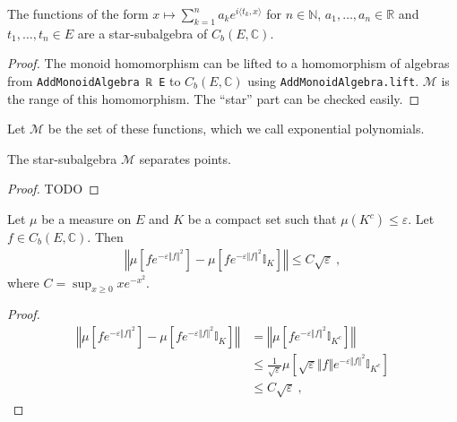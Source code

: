 \begin{lemma}\label{lem:starSubalgebra_expPoly}
 \leanok
The functions of the form $x \mapsto \sum_{k=1}^n a_k e^{i\langle t_k, x\rangle}$ for $n \in \mathbb{N}$, $a_1, \ldots, a_n \in \mathbb{R}$ and $t_1, \ldots, t_n \in E$ are a star-subalgebra of $C_b(E, \mathbb{C})$. 
\end{lemma}

\begin{proof} \leanok
The monoid homomorphism can be lifted to a homomorphism of algebras from \texttt{AddMonoidAlgebra ℝ E} to $C_b(E, \mathbb{C})$ using \texttt{AddMonoidAlgebra.lift}. $\mathcal M$ is the range of this homomorphism. The ``star'' part can be checked easily.
\end{proof}

Let $\mathcal M$ be the set of these functions, which we call exponential polynomials.

\begin{lemma}\label{lem:separates_points_expPoly}
 \leanok
{}
The star-subalgebra $\mathcal M$ separates points.
\end{lemma}

\begin{proof}
TODO
\end{proof}

\begin{lemma}\label{lem:integral_restrict_compact}
Let $\mu$ be a measure on $E$ and $K$ be a compact set such that $\mu(K^c) \le \varepsilon$. Let $f \in C_b(E, \mathbb{C})$. Then
\begin{align*}
\left\Vert \mu[fe^{-\varepsilon \Vert f \Vert^2}] - \mu[f e^{-\varepsilon \Vert f \Vert^2} \mathbb{I}_K] \right\Vert
\le C \sqrt{\varepsilon} \: ,
\end{align*}
where $C = \sup_{x \ge 0} x e^{-x^2}$.
\end{lemma}

\begin{proof}
\begin{align*}
\left\Vert \mu[fe^{-\varepsilon \Vert f \Vert^2}] - \mu[f e^{-\varepsilon \Vert f \Vert^2} \mathbb{I}_K] \right\Vert
&= \left\Vert \mu[f e^{-\varepsilon \Vert f \Vert^2} \mathbb{I}_{K^c}] \right\Vert
\\
&\le \frac{1}{\sqrt{\varepsilon}} \mu \left[ \sqrt{\varepsilon} \Vert f \Vert e^{-\varepsilon \Vert f \Vert^2} \mathbb{I}_{K^c} \right]
\\
&\le C \sqrt{\varepsilon} \: ,
\end{align*}
\end{proof}

